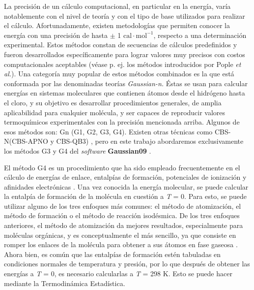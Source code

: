 La precisión de un cálculo computacional, en particular en la energía, varía notablemente con el nivel de teoría y con el tipo de base utilizados para realizar el cálculo.
Afortunadamente, existen metodologías que permiten conocer la energía con una precisión de
hasta $\pm$ 1 $\mathrm{cal\cdot mol^{-1}}$, respecto a una determinación experimental. Estos métodos constan de secuencias
de cálculos predefinidos y fueron desarrollados específicamente para lograr valores muy precisos
con costos computacionales aceptables (véase p. ej. los métodos introducidos por Pople \textit{et al.}\cite{Cuevas2003}). Una categoría muy popular de estos métodos combinados es la que está
conformada por las denominadas teorías \textit{Gaussian-n.}
Éstas se usan para calcular energías en sistemas moleculares que contienen átomos desde
el hidrógeno hasta el cloro, y su objetivo es desarrollar procedimientos generales,
de amplia aplicabilidad para cualquier molécula, y ser capaces de reproducir valores
termoquímicos experimentales con la precisión mencionada arriba.
Algunos de esos métodos son: Gn (G1, G2, G3, G4).  Existen otras técnicas como CBS-N(CBS-APNO y CBS-QB3)  \cite{Simmie2015}, pero en este trabajo abordaremos exclusivamente los métodos G3 y G4 del \textit{software} \textbf{Gaussian09} \cite{g09}.

El método G4 es un procedimiento que ha sido empleado frecuentemente en el cálculo de energías de enlace, entalpías de formación, potenciales de ionización
y afinidades electrónicas  \cite{Cuevas2003, Tajti2004}. Una vez conocida la energía molecular, se puede calcular la entalpía de formación de la molécula
en cuestión a  \textit{T} = 0. Para esto, se puede utilizar alguno de los tres enfoques más comunes:
el método de atomización, el método de formación o  el método de reacción isodésmica.
De los tres enfoques anteriores, el método de atomización da mejores resultados, especialmente
para moléculas orgánicas, y es conceptualmente el más sencillo, ya que consiste en romper
los enlaces de la molécula para obtener a sus átomos en fase gaseosa  \cite{Nicolaides1996}. Ahora bien, es común que las entalpías de formación estén tabuladas en condiciones normales de
temperatura y presión, por lo que después de obtener las energías a \textit{T} = 0, es necesario calcularlas
a \textit{T} = 298 K. Esto se puede hacer mediante la Termodinámica Estadística.


